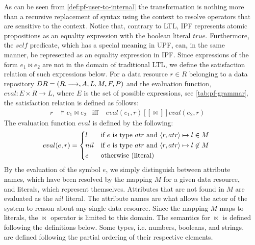 As can be seen from \autoref{def:pf-user-to-internal} the transformation is nothing more than a recursive replacement of syntax using the context to resolve operators that are sensitive to the context. Notice that, contrary to LTL, IPF represents atomic propositions as an equality expression with the boolean literal $true$. Furthermore, the $self$ predicate, which has a special meaning in UPF, can, in the same manner, be represented as an equality expression in IPF. Since expressions of the form $e_1 \bowtie e_2$ are not in the domain of traditional LTL, we define the satisfaction relation of such expressions below. For a data resource $r \in R$ belonging to a data repository $DR= \left( R, \longrightarrow, A, L, M, F, P \right)$ and the evaluation function, $eval : E \times R \rightarrow L$, where $E$ is the set of possible expressions, see \autoref{tab:pf-grammar}, the satisfaction relation is defined as follows:
\begin{align*}
    r &\models e_1 \bowtie e_2 &\text{iff }& eval(e_1, r) [\![ \bowtie ]\!] eval(e_2, r)
\end{align*}
The evaluation function $eval$ is defined by the following:
\begin{align*}
    eval(e,r) =
    \begin{cases*}
        l   & if $e$ is type $atr$ and $\langle r,atr\rangle \mapsto l \in M$ \\
        nil & if $e$ is type $atr$ and $\langle r,atr\rangle \mapsto l \not\in M$ \\
        e         & otherwise (literal)
    \end{cases*}
\end{align*}
By the evaluation of the symbol $e$, we simply distinguish between attribute names, which have been resolved by the mapping $M$ for a given data resource, and literals, which represent themselves. Attributes that are not found in $M$ are evaluated as the $nil$ literal. The attribute names are what allows the actor of the system to reason about any single data resource. Since the mapping $M$ maps to literals, the $\bowtie$ operator is limited to this domain. The semantics for $\bowtie$ is defined following the definitions below. Some types, i.e. numbers, booleans, and strings, are defined following the partial ordering of their respective elements.
